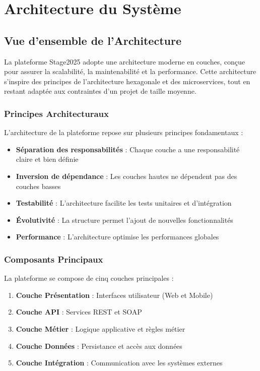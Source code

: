 \documentclass[12pt,a4paper]{report}
\begin{document}
\chapter{Architecture du Système}

\section{Vue d'ensemble de l'Architecture}

La plateforme Stage2025 adopte une architecture moderne en couches, conçue pour assurer la scalabilité, la maintenabilité et la performance. Cette architecture s'inspire des principes de l'architecture hexagonale et des microservices, tout en restant adaptée aux contraintes d'un projet de taille moyenne.

\subsection{Principes Architecturaux}

L'architecture de la plateforme repose sur plusieurs principes fondamentaux :

\begin{itemize}
    \item \textbf{Séparation des responsabilités} : Chaque couche a une responsabilité claire et bien définie
    \item \textbf{Inversion de dépendance} : Les couches hautes ne dépendent pas des couches basses
    \item \textbf{Testabilité} : L'architecture facilite les tests unitaires et d'intégration
    \item \textbf{Évolutivité} : La structure permet l'ajout de nouvelles fonctionnalités
    \item \textbf{Performance} : L'architecture optimise les performances globales
\end{itemize}

\subsection{Composants Principaux}

La plateforme se compose de cinq couches principales :

\begin{enumerate}
    \item \textbf{Couche Présentation} : Interfaces utilisateur (Web et Mobile)
    \item \textbf{Couche API} : Services REST et SOAP
    \item \textbf{Couche Métier} : Logique applicative et règles métier
    \item \textbf{Couche Données} : Persistance et accès aux données
    \item \textbf{Couche Intégration} : Communication avec les systèmes externes
\end{enumerate}
\end{document}
